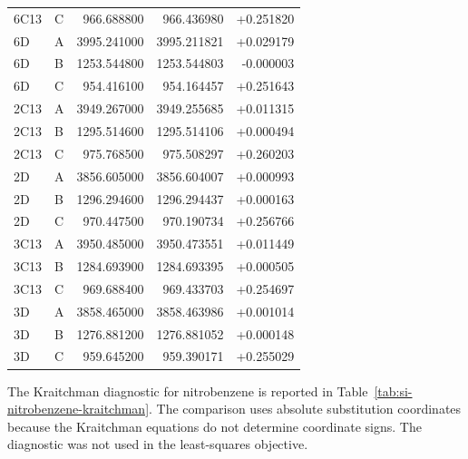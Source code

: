 \documentclass[12pt]{article}
\begin{document}
\begin{longtable}{llrrr}
6C13 & C & 966.688800 & 966.436980 & +0.251820 \\
6D & A & 3995.241000 & 3995.211821 & +0.029179 \\
6D & B & 1253.544800 & 1253.544803 & -0.000003 \\
6D & C & 954.416100 & 954.164457 & +0.251643 \\
2C13 & A & 3949.267000 & 3949.255685 & +0.011315 \\
2C13 & B & 1295.514600 & 1295.514106 & +0.000494 \\
2C13 & C & 975.768500 & 975.508297 & +0.260203 \\
2D & A & 3856.605000 & 3856.604007 & +0.000993 \\
2D & B & 1296.294600 & 1296.294437 & +0.000163 \\
2D & C & 970.447500 & 970.190734 & +0.256766 \\
3C13 & A & 3950.485000 & 3950.473551 & +0.011449 \\
3C13 & B & 1284.693900 & 1284.693395 & +0.000505 \\
3C13 & C & 969.688400 & 969.433703 & +0.254697 \\
3D & A & 3858.465000 & 3858.463986 & +0.001014 \\
3D & B & 1276.881200 & 1276.881052 & +0.000148 \\
3D & C & 959.645200 & 959.390171 & +0.255029 \\
\bottomrule
\end{longtable}

The Kraitchman diagnostic for nitrobenzene is reported in
Table~\ref{tab:si-nitrobenzene-kraitchman}. The comparison uses absolute
substitution coordinates because the Kraitchman equations do not determine
coordinate signs. The diagnostic was not used in the least-squares objective.
\end{document}
